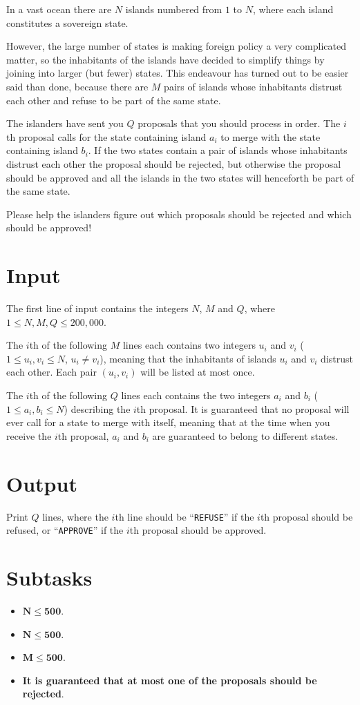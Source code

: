 In a vast ocean there are $N$ islands numbered from $1$ to $N$, where each
island constitutes a sovereign state.

However, the large number of states is making foreign policy a very complicated
matter, so the inhabitants of the islands have decided to simplify things by
joining into larger (but fewer) states. This endeavour has turned out to be
easier said than done, because there are $M$ pairs of islands whose inhabitants
distrust each other and refuse to be part of the same state.

The islanders have sent you $Q$ proposals that you should process in order. The
$i$th proposal calls for the state containing island $a_i$ to merge with the
state containing island $b_i$. If the two states contain a pair of islands
whose inhabitants distrust each other the proposal should be rejected, but
otherwise the proposal should be approved and all the islands in the two states
will henceforth be part of the same state.

Please help the islanders figure out which proposals should be rejected and
which should be approved!

\section*{Input}
The first line of input contains the integers $N$, $M$ and $Q$, where $1 \leq
N,M,Q \leq 200,000$.

The $i$th of the following $M$ lines each contains two integers $u_i$ and $v_i$
($1 \leq u_i,v_i \leq N$, $u_i \neq v_i$), meaning that the inhabitants of
islands $u_i$ and $v_i$ distrust each other. Each pair $(u_i, v_i)$ will be
listed at most once.

The $i$th of the following $Q$ lines each contains the two integers $a_i$ and
$b_i$ ($1 \leq a_i,b_i \leq N$) describing the $i$th proposal. It is guaranteed
that no proposal will ever call for a state to merge with itself, meaning that
at the time when you receive the $i$th proposal, $a_i$ and $b_i$ are guaranteed
to belong to different states.

\section*{Output}
Print $Q$ lines, where the $i$th line should be ``\texttt{REFUSE}'' if the $i$th
proposal should be refused, or ``\texttt{APPROVE}'' if the $i$th proposal should
be approved.

\section*{Subtasks}
\begin{itemize}
    \item $\mathbf{N} \mathbf{\leq} \mathbf{500}$.
    \item $\mathbf{N} \mathbf{\leq} \mathbf{500}$.
    \item $\mathbf{M} \mathbf{\leq} \mathbf{500}$.
    \item \textbf{It is guaranteed that at most one of the proposals should be
    rejected}.
\end{itemize}

